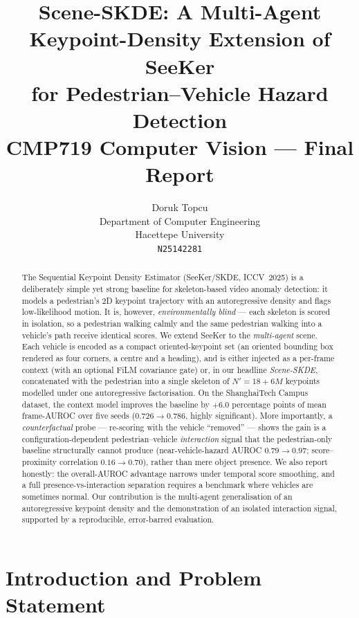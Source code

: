 \documentclass{article}
\title{Scene-SKDE: A Multi-Agent Keypoint-Density Extension of SeeKer\\
       for Pedestrian--Vehicle Hazard Detection \\ \vspace{0.4em}
       {\large CMP719 Computer Vision --- Final Report}}
\author{Doruk Topcu \\
        Department of Computer Engineering \\
        Hacettepe University \\
        \texttt{N25142281}}
\begin{document}
\maketitle

\begin{abstract}
The Sequential Keypoint Density Estimator (SeeKer/SKDE, ICCV~2025) is a
deliberately simple yet strong baseline for skeleton-based video anomaly
detection: it models a pedestrian's 2D keypoint trajectory with an
autoregressive density and flags low-likelihood motion. It is, however,
\emph{environmentally blind} --- each skeleton is scored in isolation, so a
pedestrian walking calmly and the same pedestrian walking into a vehicle's path
receive identical scores. We extend SeeKer to the \emph{multi-agent} scene.
Each vehicle is encoded as a compact oriented-keypoint set (an oriented bounding
box rendered as four corners, a centre and a heading), and is either injected as
a per-frame context (with an optional FiLM covariance gate) or, in our headline
\emph{Scene-SKDE}, concatenated with the pedestrian into a single skeleton of
$N'{=}18{+}6M$ keypoints modelled under one autoregressive factorisation. On the
ShanghaiTech Campus dataset, the context model improves the baseline by
$+6.0$ percentage points of mean frame-AUROC over five seeds
($0.726\!\rightarrow\!0.786$, highly significant). More importantly, a
\emph{counterfactual} probe --- re-scoring with the vehicle ``removed'' ---
shows the gain is a configuration-dependent pedestrian--vehicle \emph{interaction}
signal that the pedestrian-only baseline structurally cannot produce
(near-vehicle-hazard AUROC $0.79\!\rightarrow\!0.97$; score--proximity
correlation $0.16\!\rightarrow\!0.70$), rather than mere object presence. We also
report honestly: the overall-AUROC advantage narrows under temporal score
smoothing, and a full presence-vs-interaction separation requires a benchmark
where vehicles are sometimes normal. Our contribution is the multi-agent
generalisation of an autoregressive keypoint density and the demonstration of an
isolated interaction signal, supported by a reproducible, error-barred
evaluation.
\end{abstract}

\section{Introduction and Problem Statement}
\label{sec:intro}
\end{document}
